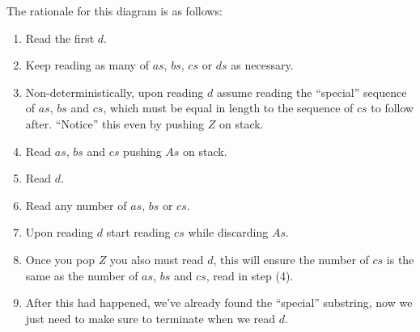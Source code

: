 \documentclass[11pt]{article}
\begin{document}
The rationale for this diagram is as follows:
\begin{enumerate}
\item Read the first $d$.
\item Keep reading as many of $as$, $bs$, $cs$ or $ds$ as necessary.
\item Non-deterministically, upon reading $d$ assume reading the
``special'' sequence of $as$, $bs$ and $cs$, which must be equal
in length to the sequence of $cs$ to follow after.
``Notice'' this even by pushing $Z$ on stack.
\item Read $as$, $bs$ and $cs$ pushing $As$ on stack.
\item Read $d$.
\item Read any number of $as$, $bs$ or $cs$.
\item Upon reading $d$ start reading $cs$ while discarding $As$.
\item Once you pop $Z$ you also must read $d$, this will ensure the number of
$cs$ is the same as the number of $as$, $bs$ and $cs$, read in step (4).
\item After this had happened, we've already found the ``special'' substring,
now we just need to make sure to terminate when we read $d$.
\end{enumerate}
\end{document}
